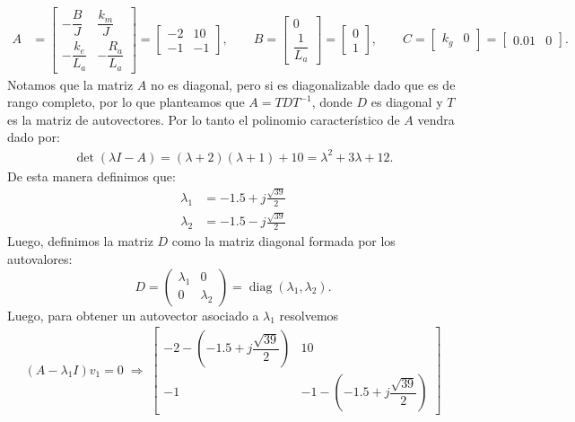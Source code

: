 \documentclass[
  11pt,
  letterpaper,
   addpoints,
   answers
  ]{exam}
\begin{document}
\begin{solution}
\begin{align}
A&=
\begin{bmatrix}
-\dfrac{B}{J} & \dfrac{k_m}{J}\\[4pt]
-\dfrac{k_e}{L_a} & -\dfrac{R_a}{L_a}
\end{bmatrix}
=
\begin{bmatrix}
-2 & 10\\
-1 & -1
\end{bmatrix},\qquad
B=
\begin{bmatrix}
0\\[2pt] \dfrac{1}{L_a}
\end{bmatrix}
=
\begin{bmatrix}
0\\ 1
\end{bmatrix},\qquad
C=\begin{bmatrix} k_g & 0\end{bmatrix}=\begin{bmatrix}0.01 & 0\end{bmatrix}.
\end{align}
Notamos que la matriz $A$ no es diagonal, pero si es diagonalizable dado que es de rango completo, por lo que planteamos que $A=TDT^{-1}$, donde $D$ es diagonal y $T$ es la matriz de autovectores. Por lo tanto el polinomio característico de $A$ vendra dado por:
\begin{align}
\det(\lambda I-A)=(\lambda+2)(\lambda+1)+10
=\lambda^2+3\lambda+12.
\end{align}
De esta manera definimos que:
\begin{align}
  \lambda_1 &= -1.5 + j\frac{\sqrt{39}}{2}\\ \lambda_2 &= -1.5 - j\frac{\sqrt{39}}{2}
\end{align}
Luego, definimos la matriz $D$ como la matriz diagonal formada por los autovalores:
\begin{equation}
  D = \begin{pmatrix} \lambda_1 & 0 \\ 0 & \lambda_2 \end{pmatrix} = \operatorname{diag}(\lambda_1,\lambda_2).
\end{equation}
Luego, para obtener un autovector asociado a $\lambda_1$ resolvemos
\begin{align}
  (A- \lambda_1 I)v_1 = 0 \;\Longrightarrow\;
  \begin{bmatrix}
    -2 -(-1.5 + j\dfrac{\sqrt{39}}{2}) & 10 \\
    -1 & -1 -(-1.5 + j\dfrac{\sqrt{39}}{2})
  \end{bmatrix}

\end{align}
\end{solution}
\end{document}
